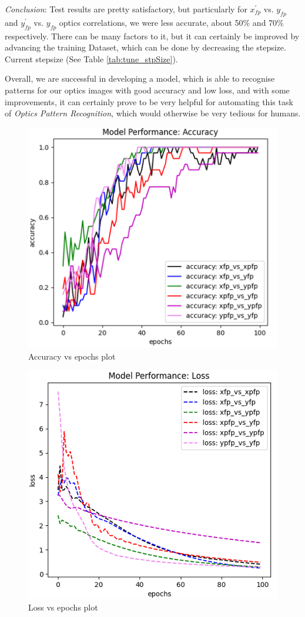 \documentclass[conference]{IEEEtran}
\begin{document}
 
\emph{Conclusion}: Test results are pretty satisfactory, but particularly for $x^{'}_{fp}$ vs. $y_{fp}$ and $y^{'}_{fp}$ vs. $y_{fp}$ optics correlations, we were less accurate, about 50\% and 70\% respectively.
There can be many factors to it, but it can certainly be improved by advancing the training Dataset, which can be done by decreasing the stepsize. Current stepsize (See Table \ref{tab:tune_stpSize}).

Overall, we are successful in developing a model, which is able to recognise patterns for our optics images with good accuracy and low loss, and with some improvements, it can certainly prove to be very helpful for automating this task of \emph{Optics Pattern Recognition}, which would otherwise be very tedious for humans.
\begin{figure}[h]
  \centering
  \includegraphics[scale=0.29]{images/acc_plot.png}
  \caption{Accuracy vs epochs plot}
  \label{fig: epochs graph1}
\end{figure}

\begin{figure}[h]
  \centering
  \includegraphics[scale=0.3]{images/loss_plot.png}
  \caption{Loss vs epochs plot}
  \label{fig: epochs graph2}
\end{figure}

\break
   

\end{document}
